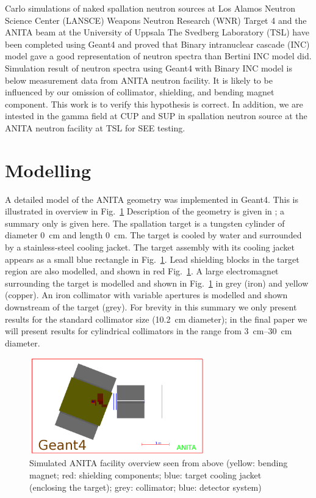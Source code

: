 \documentclass[12pt,journal]{IEEEtran}
\let\MYoriglatexcaption\caption
\renewcommand{\caption}[2][\relax]{\MYoriglatexcaption[#2]{#2}}
\begin{document}
 Carlo simulations of naked spallation neutron sources at Los Alamos Neutron Science Center (LANSCE) Weapons Neutron Research (WNR) Target 4\cite{Wender87} and the ANITA beam at the University of Uppsala The Svedberg Laboratory (TSL) have been completed using Geant4 and proved that Binary intranuclear cascade (INC) model gave a good representation of neutron spectra than Bertini INC model did\cite{Platt13}. Simulation result of neutron spectra using Geant4 with Binary INC model is below measurement data from ANITA neutron facility. It is likely to be influenced by our omission of collimator, shielding, and bending magnet component. This work is to verify this hypothesis is correct. In addition, we are intested in the gamma field at CUP and SUP in spallation neutron source at the ANITA neutron facility at TSL for SEE testing.

\section{Modelling}

A detailed model of the ANITA geometry was implemented in Geant4.
This is illustrated in overview in Fig.~\ref{fig:ANITAoverview}
Description of the geometry is given in \cite{Prokofiev2009,Prokofiev14}; a summary only is given here.
The spallation target is a tungsten cylinder of diameter \SI{0}{\cm} and length \SI{0}{\cm}.
The target is cooled by water and surrounded by a stainless-steel cooling jacket.
The target assembly with its cooling jacket appears as a small blue rectangle in Fig.~\ref{fig:ANITAoverview}.
Lead shielding blocks in the target region are also modelled, and shown in red Fig.~\ref{fig:ANITAoverview}.
A large electromagnet surrounding the target is modelled and shown in Fig.~\ref{fig:ANITAoverview} in grey (iron) and yellow (copper).
An iron collimator with variable apertures is modelled  and shown downstream of the target (grey).
For brevity in this summary we only present results for the standard collimator size (\SI{10.2}{\cm} diameter); in the final paper we will present results for cylindrical collimators in the range from \SIrange{3}{30}{\cm} diameter.

\begin{figure}[!t]
	\centering
	\includegraphics[width=3in]{overview.png}
	\caption{Simulated ANITA facility overview seen from above (yellow: bending magnet; red: shielding components; blue: target cooling jacket (enclosing the target); grey: collimator; blue: detector system)}
	\label{fig:ANITAoverview}
\end{figure}
\end{document}
